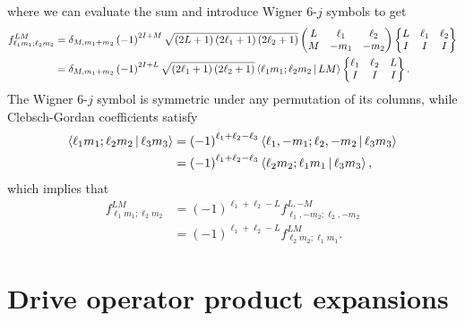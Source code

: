 \documentclass[nofootinbib,notitlepage,11pt]{revtex4-2}
\newcommand{\p}[1]{\left(#1\right)} %
\newcommand{\bk}{\Braket} %
\newcommand{\1}{\mathds{1}}
\begin{document}
where we can evaluate the sum and introduce Wigner 6-$j$ symbols to
get
\begin{align}
  f_{\ell_1 m_1;\ell_2 m_2}^{LM}
  &= \delta_{M,m_1+m_2} \p{-1}^{2I+M}
  \sqrt{\p{2L+1}\p{2\ell_1+1}\p{2\ell_2+1}}
  \begin{pmatrix}
    L & \ell_1 & \ell_2 \\
    M & -m_1 & -m_2
  \end{pmatrix}
  \begin{Bmatrix}
    L & \ell_1 & \ell_2 \\
    I & I & I
  \end{Bmatrix} \\
  &= \delta_{M,m_1+m_2} \p{-1}^{2I+L}
  \sqrt{\p{2\ell_1+1}\p{2\ell_2+1}}
  \bk{\ell_1 m_1; \ell_2 m_2| LM}
  \begin{Bmatrix}
    \ell_1 & \ell_2 & L \\
    I & I & I
  \end{Bmatrix}.
  \label{eq:trans_struct}
\end{align}
The Wigner 6-$j$ symbol is symmetric under any permutation of its
columns, while Clebsch-Gordan coefficients satisfy
\begin{align}
  \bk{\ell_1 m_1; \ell_2 m_2| \ell_3 m_3}
  &= \p{-1}^{\ell_1+\ell_2-\ell_3}
  \bk{\ell_1,-m_1; \ell_2, -m_2| \ell_3 m_3} \\
  &= \p{-1}^{\ell_1+\ell_2-\ell_3}
  \bk{\ell_2 m_2; \ell_1 m_1| \ell_3 m_3},
\end{align}
which implies that
\begin{align}
  f_{\ell_1 m_1;\ell_2 m_2}^{LM}
  &= \p{-1}^{\ell_1+\ell_2-L} f_{\ell_1,-m_2;\ell_2,-m_2}^{L,-M} \\
  &= \p{-1}^{\ell_1+\ell_2-L} f_{\ell_2 m_2;\ell_1 m_1}^{LM}.
\end{align}

\section{Drive operator product expansions}
\label{sec:drive_prod}
\end{document}

